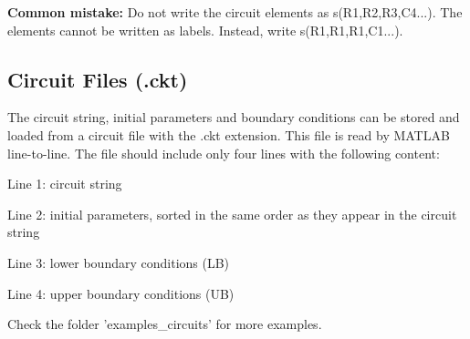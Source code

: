 \documentclass[9pt,a4paper,oneside]{book}
\begin{document}
\textbf{Common mistake:} Do not write the circuit elements as s(R1,R2,R3,C4...). The elements cannot be written as labels. Instead, write s(R1,R1,R1,C1...).

\subsection{Circuit Files (.ckt)}

The circuit string, initial parameters and boundary conditions can be stored and loaded from a circuit file with the .ckt extension. This file is read by MATLAB line-to-line. The file should include only four lines with the following content:

Line 1: circuit string

Line 2: initial parameters, sorted in the same order as they appear in the circuit string

Line 3: lower boundary conditions (LB)

Line 4: upper boundary conditions (UB)

Check the folder 'examples\_circuits' for more examples.

\begin{center}
\end{center}
\end{document}
